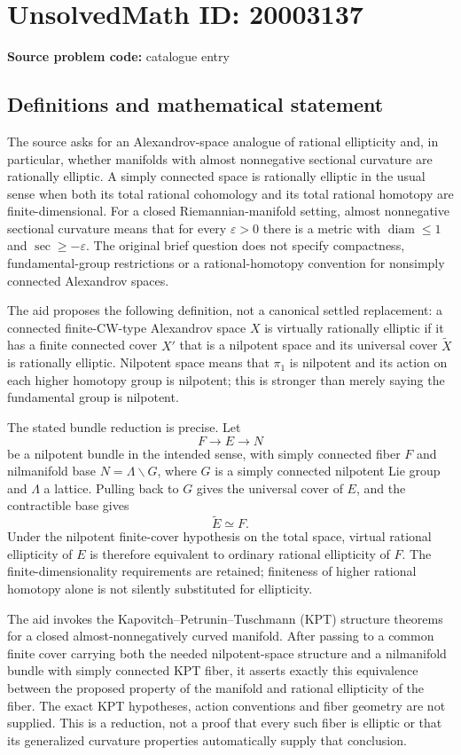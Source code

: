 \documentclass[11pt]{article}
\newcommand{\eps}{\varepsilon}
\begin{document}
\section*{UnsolvedMath ID: 20003137}
\textbf{Source problem code:} catalogue entry
\subsection{Definitions and mathematical statement}
The source asks for an Alexandrov-space analogue of rational ellipticity and, in particular, whether manifolds with almost nonnegative sectional curvature are rationally elliptic. A simply connected space is rationally elliptic in the usual sense when both its total rational cohomology and its total rational homotopy are finite-dimensional. For a closed Riemannian-manifold setting, almost nonnegative sectional curvature means that for every $\eps>0$ there is a metric with $\operatorname{diam}\leq1$ and $\sec\geq-\eps$. The original brief question does not specify compactness, fundamental-group restrictions or a rational-homotopy convention for nonsimply connected Alexandrov spaces.

The aid proposes the following definition, not a canonical settled replacement: a connected finite-CW-type Alexandrov space $X$ is virtually rationally elliptic if it has a finite connected cover $X'$ that is a nilpotent space and its universal cover $\widetilde X$ is rationally elliptic. Nilpotent space means that $\pi_1$ is nilpotent and its action on each higher homotopy group is nilpotent; this is stronger than merely saying the fundamental group is nilpotent.

The stated bundle reduction is precise. Let
\[
F\longrightarrow E\longrightarrow N
\]
be a nilpotent bundle in the intended sense, with simply connected fiber $F$ and nilmanifold base $N=\Lambda\backslash G$, where $G$ is a simply connected nilpotent Lie group and $\Lambda$ a lattice. Pulling back to $G$ gives the universal cover of $E$, and the contractible base gives
\[
\widetilde E\simeq F.
\]
Under the nilpotent finite-cover hypothesis on the total space, virtual rational ellipticity of $E$ is therefore equivalent to ordinary rational ellipticity of $F$. The finite-dimensionality requirements are retained; finiteness of higher rational homotopy alone is not silently substituted for ellipticity.

The aid invokes the Kapovitch--Petrunin--Tuschmann (KPT) structure theorems for a closed almost-nonnegatively curved manifold. After passing to a common finite cover carrying both the needed nilpotent-space structure and a nilmanifold bundle with simply connected KPT fiber, it asserts exactly this equivalence between the proposed property of the manifold and rational ellipticity of the fiber. The exact KPT hypotheses, action conventions and fiber geometry are not supplied. This is a reduction, not a proof that every such fiber is elliptic or that its generalized curvature properties automatically supply that conclusion.
\end{document}
